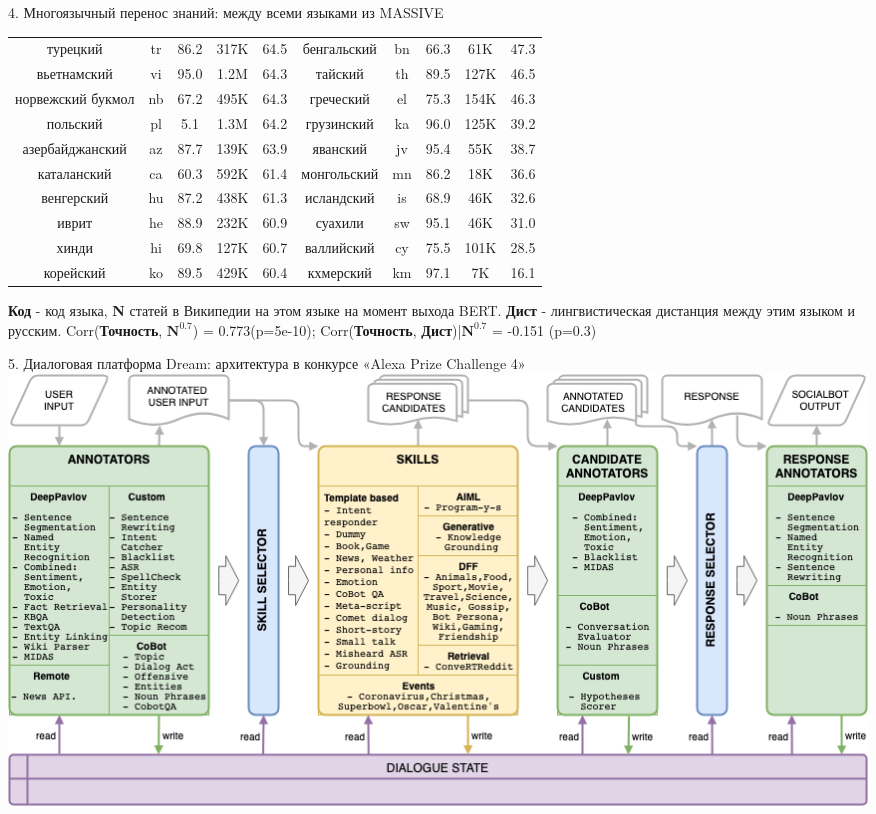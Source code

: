 \begin{frame}{4. Многоязычный перенос знаний: между всеми языками из MASSIVE}
{\begin{tabular}[baseline={(0,2.1)}]{|c|c|c|c|c||c|c|c|c|c|}
турецкий & tr & 86.2 & 317K & 64.5 & бенгальский & bn & 66.3 & 61K & 47.3 \\
вьетнамский & vi & 95.0 & 1.2M & 64.3 & тайский & th & 89.5 & 127K & 46.5 \\
норвежский букмол & nb & 67.2 & 495K & 64.3 & греческий & el & 75.3 & 154K & 46.3 \\
польский & pl & 5.1 & 1.3M & 64.2 & грузинский & ka & 96.0 & 125K & 39.2\\
азербайджанский & az & 87.7 & 139K & 63.9 & яванский & jv & 95.4 & 55K & 38.7 \\
каталанский & ca & 60.3 & 592K & 61.4 & монгольский & mn & 86.2 & 18K & 36.6 \\
венгерский & hu & 87.2 & 438K & 61.3 & исландский & is & 68.9 & 46K & 32.6 \\
иврит & he & 88.9 & 232K & 60.9 & суахили & sw & 95.1 & 46K & 31.0 \\
хинди & hi & 69.8 & 127K & 60.7 & валлийский & cy & 75.5 & 101K & 28.5 \\
корейский & ko & 89.5 & 429K & 60.4 & кхмерский & km & 97.1 & 7K & 16.1\\ \hline
\end{tabular}}
\newline
\scriptsize \textbf{Код} - код языка, \textbf{N} статей в Википедии на этом языке на момент выхода BERT.
\newline \textbf{Дист} - лингвистическая дистанция между этим языком и русским.
\newline
Corr(\textbf{Точность}, $\textbf{N}^{0.7}$) = 0.773(p=5e-10); 
Corr(\textbf{Точность}, \textbf{Дист})|$\textbf{N}^{0.7}$ = -0.151 (p=0.3)
\end{frame}


\begin{frame}{5. Диалоговая платформа Dream: архитектура в конкурсе «Alexa Prize Challenge 4»}
    \centering
    \includegraphics[width=1\linewidth]{images/Alexa2_.png} 
\end{frame}

